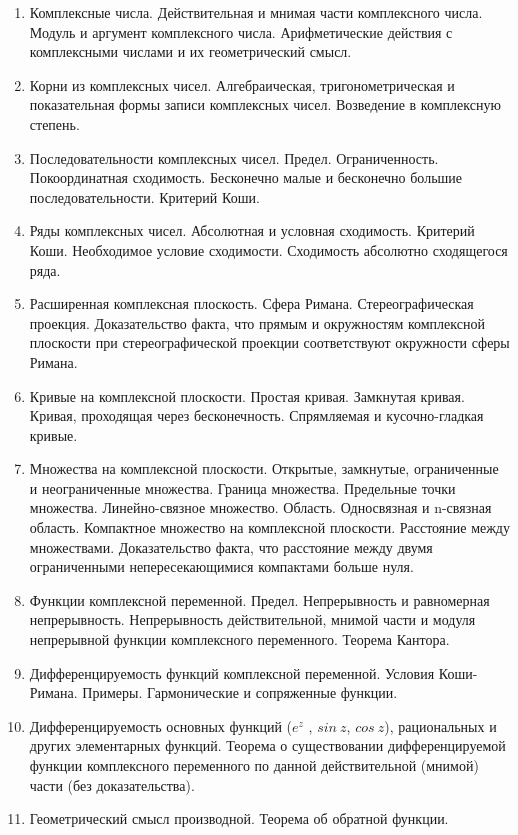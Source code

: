 \documentclass{article}
\begin{document}
\begin{enumerate}
	\item Комплексные числа. Действительная и мнимая части комплексного числа. Модуль и аргумент комплексного числа.
	      Арифметические действия с комплексными числами и их геометрический смысл.
	\item Корни из комплексных чисел. Алгебраическая, тригонометрическая и показательная формы записи комплексных чисел.
	      Возведение в комплексную степень.
	\item Последовательности комплексных чисел. Предел. Ограниченность. Покоординатная сходимость.
	      Бесконечно малые и бесконечно большие последовательности. Критерий Коши.
	\item Ряды комплексных чисел. Абсолютная и условная сходимость. Критерий Коши. Необходимое условие
	      сходимости. Сходимость абсолютно сходящегося ряда.
	\item Расширенная комплексная плоскость. Сфера Римана. Стереографическая проекция. Доказательство факта,
	      что прямым и окружностям комплексной плоскости при стереографической проекции соответствуют
	      окружности сферы Римана.
	\item Кривые на комплексной плоскости. Простая кривая. Замкнутая кривая. Кривая, проходящая через бесконечность.
	      Спрямляемая и кусочно-гладкая кривые.
	\item Множества на комплексной плоскости. Открытые, замкнутые, ограниченные и неограниченные множества.
	      Граница множества. Предельные точки множества. Линейно-связное множество. Область. Односвязная
	      и n-связная область. Компактное множество на комплексной плоскости. Расстояние между множествами.
	      Доказательство факта, что расстояние между двумя ограниченными непересекающимися компактами
	      больше нуля.
	\item Функции комплексной переменной. Предел. Непрерывность и равномерная непрерывность. Непрерывность
	      действительной, мнимой части и модуля непрерывной функции комплексного переменного. Теорема Кантора.
	\item Дифференцируемость функций комплексной переменной. Условия Коши-Римана. Примеры. Гармонические и сопряженные функции.
	\item Дифференцируемость основных функций ($e^z$ , $sin\ z$, $cos\ z$), рациональных и других элементарных функций.
	      Теорема о существовании дифференцируемой функции комплексного переменного по данной действительной (мнимой) части (без доказательства).
	\item Геометрический смысл производной. Теорема об обратной функции.

\end{enumerate}
\end{document}
